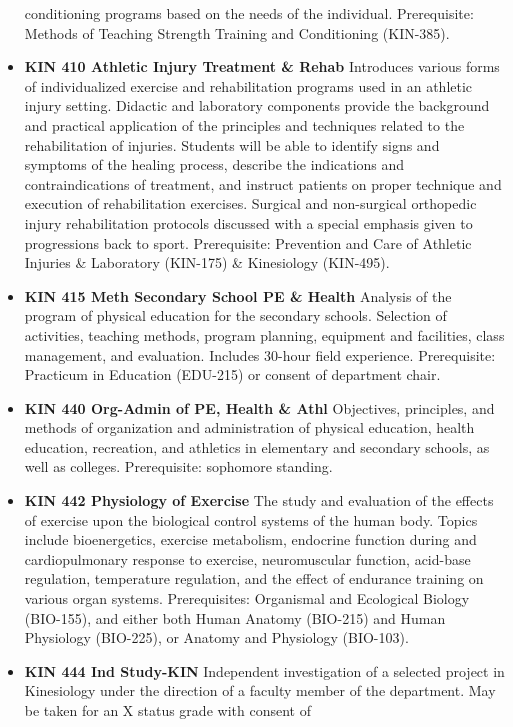 \documentclass[
  letterpaper,
]{scrbook}
\begin{document}
\begin{itemize}
  conditioning programs based on the needs of the individual.
  Prerequisite: Methods of Teaching Strength Training and Conditioning
  (KIN-385).
\item
  \textbf{KIN 410 Athletic Injury Treatment \& Rehab} Introduces various
  forms of individualized exercise and rehabilitation programs used in
  an athletic injury setting. Didactic and laboratory components provide
  the background and practical application of the principles and
  techniques related to the rehabilitation of injuries. Students will be
  able to identify signs and symptoms of the healing process, describe
  the indications and contraindications of treatment, and instruct
  patients on proper technique and execution of rehabilitation
  exercises. Surgical and non-surgical orthopedic injury rehabilitation
  protocols discussed with a special emphasis given to progressions back
  to sport. Prerequisite: Prevention and Care of Athletic Injuries \&
  Laboratory (KIN-175) \& Kinesiology (KIN-495).
\item
  \textbf{KIN 415 Meth Secondary School PE \& Health} Analysis of the
  program of physical education for the secondary schools. Selection of
  activities, teaching methods, program planning, equipment and
  facilities, class management, and evaluation. Includes 30-hour field
  experience. Prerequisite: Practicum in Education (EDU-215) or consent
  of department chair.
\item
  \textbf{KIN 440 Org-Admin of PE, Health \& Athl} Objectives,
  principles, and methods of organization and administration of physical
  education, health education, recreation, and athletics in elementary
  and secondary schools, as well as colleges. Prerequisite: sophomore
  standing.
\item
  \textbf{KIN 442 Physiology of Exercise} The study and evaluation of
  the effects of exercise upon the biological control systems of the
  human body. Topics include bioenergetics, exercise metabolism,
  endocrine function during and cardiopulmonary response to exercise,
  neuromuscular function, acid-base regulation, temperature regulation,
  and the effect of endurance training on various organ systems.
  Prerequisites: Organismal and Ecological Biology (BIO-155), and either
  both Human Anatomy (BIO-215) and Human Physiology (BIO-225), or
  Anatomy and Physiology (BIO-103).
\item
  \textbf{KIN 444 Ind Study-KIN} Independent investigation of a selected
  project in Kinesiology under the direction of a faculty member of the
  department. May be taken for an X status grade with consent of

\end{itemize}
\end{document}
